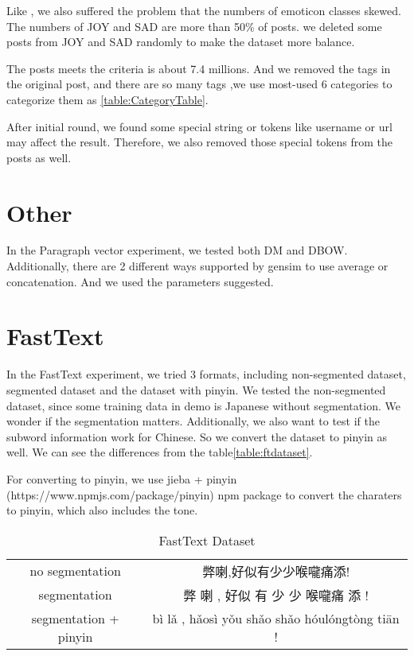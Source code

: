 Like \cite{zhao2012moodlens}, we also suffered the problem that the numbers of emoticon classes skewed. The numbers of JOY and SAD are more than 50\% of posts. 
we deleted some posts from JOY and SAD randomly to make the dataset more balance.  

The posts meets the criteria is about 7.4 millions. And we removed the tags in the original post, and there are so many tags 
,we use most-used 6 categories to categorize them as \ref{table:CategoryTable}.

After initial round, we found some special string or tokens like username or url may affect the result. 
Therefore, we also removed those special tokens from the posts as well.

\section{Other}

In the Paragraph vector experiment, we tested both DM and DBOW. Additionally, there are 2 different ways supported by gensim to use average or concatenation.
And we used the parameters suggested. 

\section{FastText}

In the FastText experiment, we tried 3 formats, including non-segmented dataset, segmented dataset and the dataset with pinyin.
We tested the non-segmented dataset, since some training data in demo is Japanese without segmentation. We wonder if the segmentation matters.
Additionally, we also want to test if the subword information work for Chinese. So we convert the dataset to pinyin as well. We can see the differences from the table\ref{table:ftdataset}.

For converting to pinyin, we use jieba + pinyin (https://www.npmjs.com/package/pinyin) npm package to convert the  charaters to pinyin, which also includes the tone.

\begin{table}[]
\centering
\caption{FastText Dataset}
\label{ftdataset}
\begin{tabular}{|c|c|}
\hline
   & \\
\hline
no segmentation  & 弊喇,好似有少少喉嚨痛添! \\
segmentation  & 弊 喇 , 好似 有 少 少 喉嚨痛 添 ! \\
segmentation + pinyin  & bì lǎ , hǎosì yǒu shǎo shǎo hóulóngtòng tiān ! \\
\hline
\end{tabular}
\end{table}


